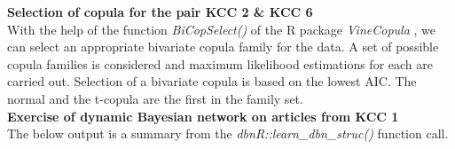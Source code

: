 

\textbf{Selection of copula for the pair \ac{KCC} 2 \& \ac{KCC} 6} \\ 
With the help of the function \textit{BiCopSelect()} of the R package \textit{VineCopula} \citep{nagler2019vinecopula}, we can select an appropriate bivariate copula family for the data. A set of possible copula families is considered and maximum likelihood estimations for each are carried out. Selection of a bivariate copula is based on the lowest \ac{AIC}. The normal and the t-copula are the first in the family set.
\\




\textbf{Exercise of dynamic Bayesian network on articles from KCC 1} \\ 
The below output is a summary from the \textit{dbnR::learn\_dbn\_struc()} function call.
\\





